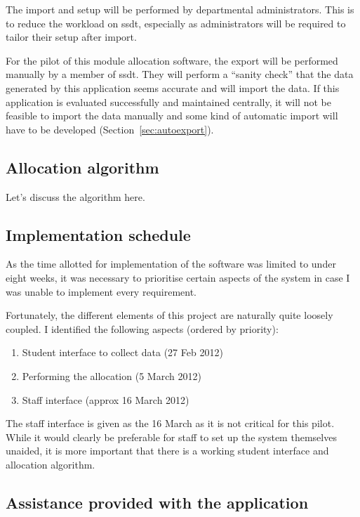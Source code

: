 \documentclass[]{scrartcl}
\begin{document}
The import and setup will be performed by departmental administrators. This is
to reduce the workload on \gls{ssdt}, especially as administrators will be
required to tailor their setup after import.

For the pilot of this module allocation software, the export will be performed
manually by a member of \gls{ssdt}. They will perform a ``sanity check'' that
the data generated by this application seems accurate and will import the
data. If this application is evaluated successfully and maintained centrally,
it will not be feasible to import the data manually and some kind of automatic
import will have to be developed (Section~\ref{sec:autoexport}).


\subsection{Allocation algorithm}

Let's discuss the algorithm here.

\subsection{Implementation schedule}

As the time allotted for implementation of the software was limited to under
eight weeks, it was necessary to prioritise certain aspects of the system in
case I was unable to implement every requirement.

Fortunately, the different elements of this project are naturally quite
loosely coupled. I identified the following aspects (ordered by priority):

\begin{enumerate}
  \item Student interface to collect data (27 Feb 2012)
  \item Performing the allocation (5 March 2012)
  \item Staff interface (approx 16 March 2012)
\end{enumerate}

The staff interface is given as the 16 March as it is not critical for this
pilot. While it would clearly be preferable for staff to set up the system
themselves unaided, it is more important that there is a working student
interface and allocation algorithm.

\subsection{Assistance provided with the application}
\end{document}
